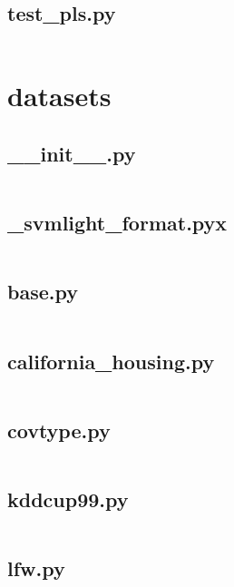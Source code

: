 \documentclass{article}
\begin{document}
\subsection{test\_pls.py}
\inputminted{python}{/home/dufferzafar/dev/@clones/scikit-learn/sklearn/cross_decomposition/tests/test_pls.py}
\newpage

\section{datasets}

\subsection{\_\_init\_\_.py}
\inputminted{python}{/home/dufferzafar/dev/@clones/scikit-learn/sklearn/datasets/__init__.py}
\newpage

\subsection{\_svmlight\_format.pyx}
\inputminted{cython}{/home/dufferzafar/dev/@clones/scikit-learn/sklearn/datasets/_svmlight_format.pyx}
\newpage

\subsection{base.py}
\inputminted{python}{/home/dufferzafar/dev/@clones/scikit-learn/sklearn/datasets/base.py}
\newpage

\subsection{california\_housing.py}
\inputminted{python}{/home/dufferzafar/dev/@clones/scikit-learn/sklearn/datasets/california_housing.py}
\newpage

\subsection{covtype.py}
\inputminted{python}{/home/dufferzafar/dev/@clones/scikit-learn/sklearn/datasets/covtype.py}
\newpage

\subsection{kddcup99.py}
\inputminted{python}{/home/dufferzafar/dev/@clones/scikit-learn/sklearn/datasets/kddcup99.py}
\newpage

\subsection{lfw.py}
\inputminted{python}{/home/dufferzafar/dev/@clones/scikit-learn/sklearn/datasets/lfw.py}
\newpage
\end{document}
